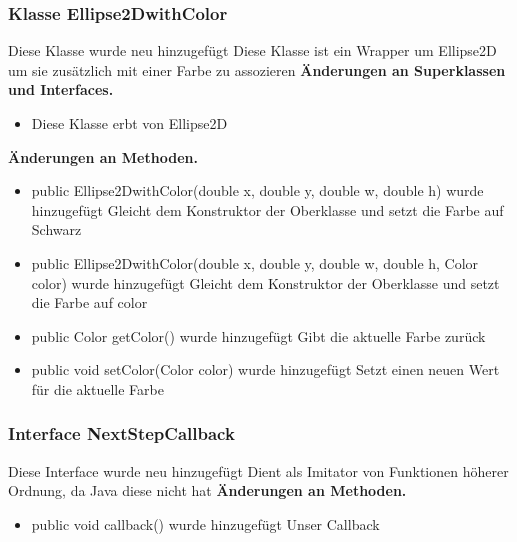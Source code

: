 \documentclass{article}
\begin{document}
	\subsubsection{Klasse Ellipse2DwithColor}
    Diese Klasse wurde neu hinzugefügt
    Diese Klasse ist ein Wrapper um Ellipse2D um
    sie zusätzlich mit einer Farbe zu assozieren
	    \textbf{Änderungen an Superklassen und Interfaces.}\newline
	   \begin{itemize}
            \item Diese Klasse erbt von Ellipse2D\newline
           \end{itemize}
    \textbf{Änderungen an Methoden.}\newline
	   \begin{itemize}
           \item public Ellipse2DwithColor(double x, double y, double w, double h) wurde hinzugefügt\newline
               Gleicht dem Konstruktor der Oberklasse und setzt die Farbe auf Schwarz
           \item public Ellipse2DwithColor(double x, double y, double w, double h, Color color) wurde hinzugefügt\newline
               Gleicht dem Konstruktor der Oberklasse und setzt die Farbe auf color
           \item public Color getColor() wurde hinzugefügt\newline
               Gibt die aktuelle Farbe zurück
           \item public void setColor(Color color) wurde hinzugefügt\newline
               Setzt einen neuen Wert für die aktuelle Farbe
           \end{itemize}

	\subsubsection{Interface NextStepCallback}
    Diese Interface wurde neu hinzugefügt
    Dient als Imitator von Funktionen höherer Ordnung,
    da Java diese nicht hat
    \textbf{Änderungen an Methoden.}\newline
	   \begin{itemize}
           \item public void callback() wurde hinzugefügt\newline
               Unser Callback
           \end{itemize}
\end{document}
